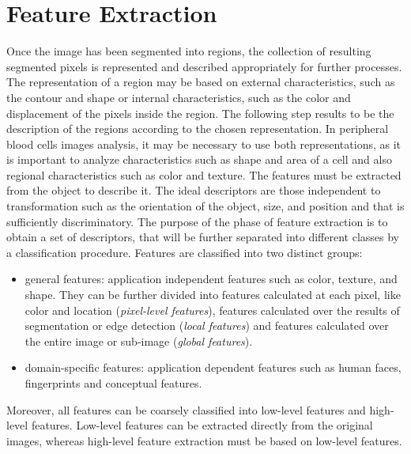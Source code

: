 \documentclass[final,a4paper,12pt,english]{UnicaPhdThesis3}
\begin{document}
\chapter{Feature Extraction}
Once the image has been segmented into regions, the collection of resulting segmented pixels is represented and described appropriately for further processes. The representation of a region may be based on external characteristics, such as the contour and shape or internal characteristics, such as the color and displacement of the pixels inside the region. The following step results to be the description of the regions according to the chosen representation. In peripheral blood cells images analysis, it may be necessary to use both representations, as it is important to analyze characteristics such as shape and area of a cell and also regional characteristics such as color and texture. The features must be extracted from the object to describe it.
The ideal descriptors are those independent to transformation such as the orientation of the object, size, and position and that is sufficiently discriminatory. The purpose of the phase of feature extraction is to obtain a set of descriptors, that will be further separated into different classes by a classification procedure. Features are classified into two distinct groups:
\begin{itemize}
	\item general features: application independent features such as color, texture, and shape. They can be further divided into features calculated at each pixel, like color and location (\textit{pixel-level features}), features calculated over the results of segmentation or edge detection (\textit{local features}) and features calculated over the entire image or sub-image (\textit{global features}).
	\item domain-specific features: application dependent features such as human faces, fingerprints and conceptual features.
\end{itemize}
Moreover, all features can be coarsely classified into low-level features and high-level features. Low-level features can be extracted directly from the original images, whereas high-level feature extraction must be based on low-level features. 
\end{document}
